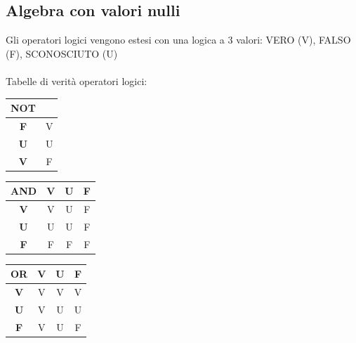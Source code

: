 \documentclass[../main.tex]{subfiles}
\begin{document}
	\subsection{Algebra con valori nulli}
	Gli operatori logici vengono estesi con una logica a 3 valori: VERO (V), FALSO (F), SCONOSCIUTO (U)\\\\
	Tabelle di verità operatori logici:
	\begin{center}
		\begin{tabular}{ c|c }
			\textbf{NOT} & \\
			\hline
			\textbf{F} & V\\
			\textbf{U} & U\\
			\textbf{V} & F
		\end{tabular}
		\hfill
		\begin{tabular}{ c|c c c }
			\textbf{AND} & \textbf{V} & \textbf{U} & \textbf{F}\\
			\hline
			\textbf{V} & V & U & F \\
			\textbf{U} & U & U & F\\
			\textbf{F} & F & F & F
		\end{tabular}
		\hfill
		\begin{tabular}{ c|c c c }
			\textbf{OR} & \textbf{V} & \textbf{U} & \textbf{F}\\
			\hline
			\textbf{V} & V & V & V \\
			\textbf{U} & V & U & U\\
			\textbf{F} & V & U & F
		\end{tabular}
	\end{center}
\end{document}

